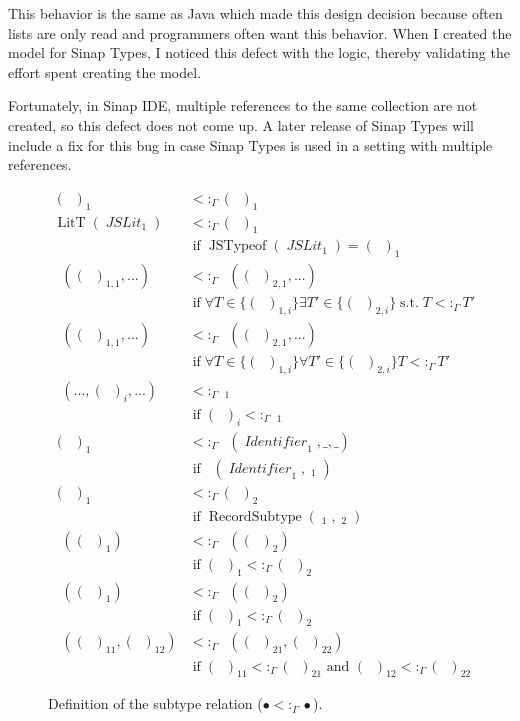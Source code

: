\documentclass[12pt]{article}
\DeclareMathOperator{\LitT}{LitT}
\DeclareMathOperator{\JSLit}{\textit{JSLit}}
\DeclareMathOperator{\JSTypeof}{JSTypeof}
\DeclareMathOperator{\RecT}{RecT_\Gamma}
\DeclareMathOperator{\ObjT}{ObjT_\Gamma}
\DeclareMathOperator{\ListT}{ListT_\Gamma}
\DeclareMathOperator{\SetT}{SetT_\Gamma}
\DeclareMathOperator{\MapT}{MapT_\Gamma}
\DeclareMathOperator{\UnionT}{UnionT_\Gamma}
\DeclareMathOperator{\InterT}{InterT_\Gamma}
\DeclareMathOperator{\Identifier}{\textit{Identifier}}
\DeclareMathOperator{\Type}{{\textit{Type}_\Gamma}}
\DeclareMathOperator{\ObjectSubtype}{ObjectSubtype_\Gamma}
\DeclareMathOperator{\RecordSubtype}{RecordSubtype}
\DeclareMathOperator{\textif}{ if }
\DeclareMathOperator{\suchthat}{s.t.}
\newcommand{\subtype}{<:_\Gamma}
\begin{document}
This behavior is the same as Java which made this design decision 
because often lists are only read and programmers often want
this behavior. When I created the model for Sinap Types,
I noticed this defect with the logic, thereby validating 
the effort spent creating the model. 

Fortunately, in Sinap IDE, multiple references to 
the same collection are not created,
so this defect does not come up. A later release 
of Sinap Types will include a fix for this bug in 
case Sinap Types is used in a setting with multiple references.

\newcommand{\stfif}{\\&\textif}

\begin{figure}
\begin{mdframed}        
\begin{align*}
    (\Type)_1&\subtype(\Type)_1 \\
    \LitT(\JSLit_1)&\subtype(\Type)_1 \stfif \JSTypeof(\JSLit_1) = (\Type)_1 \\
    \UnionT((\Type)_{1,1}, ...)&\subtype\UnionT((\Type)_{2,1}, ...) 
    \stfif \forall T\in \{(\Type)_{1,i}\} \exists T' \in \{(\Type)_{2,i}\} \suchthat T\subtype T' \\
    \InterT((\Type)_{1,1}, ...)&\subtype\InterT((\Type)_{2,1}, ...) 
    \stfif \forall T\in \{(\Type)_{1,i}\} \forall T' \in \{(\Type)_{2,i}\} T\subtype T' \\
    \InterT(..., (\Type)_i, ...)&\subtype\ObjT_1 \stfif (\Type)_i\subtype\ObjT_1  \\
    (\Type)_1 &\subtype \ObjT(\Identifier_1, \_, \_) \stfif \ObjectSubtype(\Identifier_1, \ObjT_1)\\
    (\Type)_1&\subtype(\Type)_2 \stfif \RecordSubtype(\RecT_1, \RecT_2) \\
    \ListT((\Type)_1)&\subtype\ListT((\Type)_2) \stfif (\Type)_1\subtype(\Type)_2 \\
    \SetT((\Type)_1)&\subtype\SetT((\Type)_2) \stfif (\Type)_1\subtype(\Type)_2 \\
    \MapT((\Type)_{11}, (\Type)_{12})&\subtype\MapT((\Type)_{21}, (\Type)_{22}) \stfif (\Type)_{11}\subtype(\Type)_{21} \text{ and } (\Type)_{12}\subtype(\Type)_{22} 
\end{align*}
\end{mdframed}        
\caption{Definition of the subtype relation (\(\bullet\subtype\bullet\)).}
\label{subtype-definitions}
\end{figure}
\end{document}
